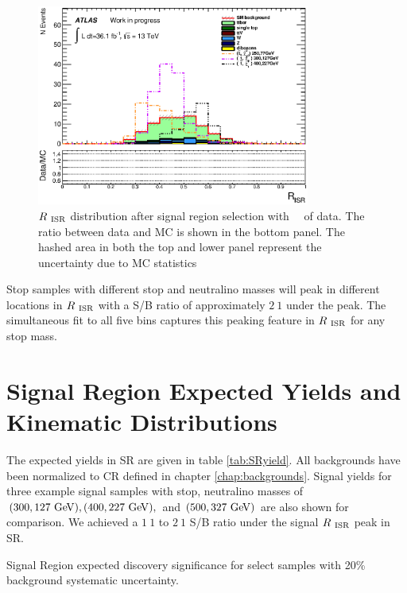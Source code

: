 \begin{figure}[htbp]
  \begin{center}
     \includegraphics[width=0.80\textwidth]{figures/plotSR/SR_ND1_RISR_7SR.eps}
  \end{center}
  \caption{ $R_{~\mathrm{ISR}}$ distribution after signal region selection with \intlumi\ \ifb\ of data. The ratio between data and MC is shown in the bottom panel. The hashed area in both the top and lower panel represent the uncertainty due to MC statistics}
  \label{fig:SR:RISR}
\end{figure}

\indent Stop samples with different stop and neutralino masses will peak in different locations in $R_{~\mathrm{ISR}}$ with a S/B ratio of approximately $2\:1$ under the peak.  The simultaneous fit to all five bins captures this peaking feature in $R_{~\mathrm{ISR}}$ for any stop mass.  \\

\section{Signal Region Expected Yields and Kinematic Distributions}
\label{sec:SR:Yields}

\indent The expected yields in SR are given in table \ref{tab:SRyield}.  All backgrounds have been normalized to CR defined in chapter \ref{chap:backgrounds}.  Signal yields for three example signal samples with stop, neutralino masses of $(300,127 \gev), (400,227\gev), $ and $(500,327 \gev)$ are also shown for comparison.  We achieved a $1\:1$ to $2\:1$ S/B ratio under the signal $R_{~\mathrm{ISR}}$ peak in SR. \\

\begin{table}
  \begin{center}
    \def\arraystretch{1.4}%
    
    
    
    
    
  \end{center}
  \caption{Signal Region expected discovery significance for select samples with 20\% background systematic uncertainty.}
  \label{tab:SRyield}
\end{table}

